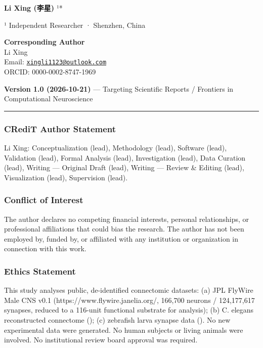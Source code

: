 \documentclass[
]{article}
\begin{document}
\textbf{Li Xing (李星)} ¹*

¹ Independent Researcher · Shenzhen, China

\textbf{Corresponding Author}\\
Li Xing\\
Email:
\href{mailto:xingli1123@outlook.com}{\nolinkurl{xingli1123@outlook.com}}\\
ORCID: 0000-0002-8747-1969

\textbf{Version 1.0 (2026-10-21)} --- Targeting Scientific Reports /
Frontiers in Computational Neuroscience

\begin{center}\rule{0.5\linewidth}{0.5pt}\end{center}

\subsubsection{CRediT Author Statement}\label{credit-author-statement}

Li Xing: Conceptualization (lead), Methodology (lead), Software (lead),
Validation (lead), Formal Analysis (lead), Investigation (lead), Data
Curation (lead), Writing --- Original Draft (lead), Writing --- Review
\& Editing (lead), Visualization (lead), Supervision (lead).

\subsubsection{Conflict of Interest}\label{conflict-of-interest}

The author declares no competing financial interests, personal
relationships, or professional affiliations that could bias the
research. The author has not been employed by, funded by, or affiliated
with any institution or organization in connection with this work.

\subsubsection{Ethics Statement}\label{ethics-statement}

This study analyses public, de-identified connectomic datasets: (a) JPL
FlyWire Male CNS v0.1 (https://www.flywire.janelia.org/, 166,700 neurons
/ 124,177,617 synapses, reduced to a 116-unit functional substrate for
analysis); (b) C. elegans reconstructed connectome (\citet{ref32}); (c) zebrafish larva synapse data (\citet{ref24}). No
new experimental data were generated. No human subjects or living
animals were involved. No institutional review board approval was
required.
\end{document}
